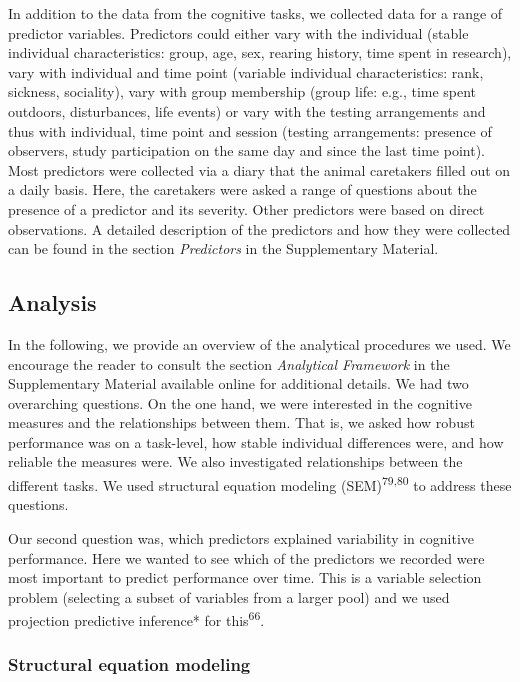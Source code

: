 \documentclass[
  man,floatsintext]{apa6}
\begin{document}
In addition to the data from the cognitive tasks, we collected data for a range of predictor variables. Predictors could either vary with the individual (stable individual characteristics: group, age, sex, rearing history, time spent in research), vary with individual and time point (variable individual characteristics: rank, sickness, sociality), vary with group membership (group life: e.g., time spent outdoors, disturbances, life events) or vary with the testing arrangements and thus with individual, time point and session (testing arrangements: presence of observers, study participation on the same day and since the last time point). Most predictors were collected via a diary that the animal caretakers filled out on a daily basis. Here, the caretakers were asked a range of questions about the presence of a predictor and its severity. Other predictors were based on direct observations. A detailed description of the predictors and how they were collected can be found in the section \emph{Predictors} in the Supplementary Material.

\hypertarget{analysis}{%
\subsection{Analysis}\label{analysis}}

In the following, we provide an overview of the analytical procedures we used. We encourage the reader to consult the section \emph{Analytical Framework} in the Supplementary Material available online for additional details. We had two overarching questions. On the one hand, we were interested in the cognitive measures and the relationships between them. That is, we asked how robust performance was on a task-level, how stable individual differences were, and how reliable the measures were. We also investigated relationships between the different tasks. We used structural equation modeling (SEM)\textsuperscript{79,80} to address these questions.

Our second question was, which predictors explained variability in cognitive performance. Here we wanted to see which of the predictors we recorded were most important to predict performance over time. This is a variable selection problem (selecting a subset of variables from a larger pool) and we used projection predictive inference* for this\textsuperscript{66}.

\hypertarget{structural-equation-modeling}{%
\subsubsection{Structural equation modeling}\label{structural-equation-modeling}}
\end{document}
